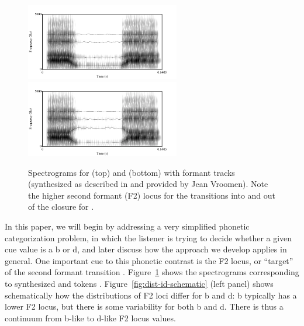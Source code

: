 \begin{figure}[htb]
  \centering
  \includegraphics[width=0.6\textwidth]{figs/vroomen-aba-spectrogram-tracks.pdf}
  \includegraphics[width=0.6\textwidth]{figs/vroomen-ada-spectrogram-tracks.pdf}
  \caption{Spectrograms for  (top) and  (bottom) with formant tracks (synthesized as described in \protect\textcite{Vroomen2004} and provided by Jean Vroomen).  Note the higher second formant (F2) locus for the transitions into and out of the closure for .}
  \label{fig:aba-ada-spectrograms}
\end{figure}

In this paper, we will begin by addressing a very simplified phonetic categorization problem, in which the listener is trying to decide whether a given cue value is a \ph b or \ph d, and later discuss how the approach we develop applies in general.
One important cue to this phonetic contrast is the F2 locus, or ``target'' of the second formant transition \autocite{Delattre1955}.  Figure~\ref{fig:aba-ada-spectrograms} shows the spectrograms corresponding to synthesized  and  tokens \autocite[synthesized by][]{Vroomen2004}.  Figure~\ref{fig:dist-id-schematic} (left panel) shows schematically how the distributions of F2 loci differ for \ph b and \ph d: \ph b typically has a lower F2 locus, but there is some variability for both \ph b and \ph d.  There is thus a continuum from \ph b-like to \ph d-like F2 locus values.

